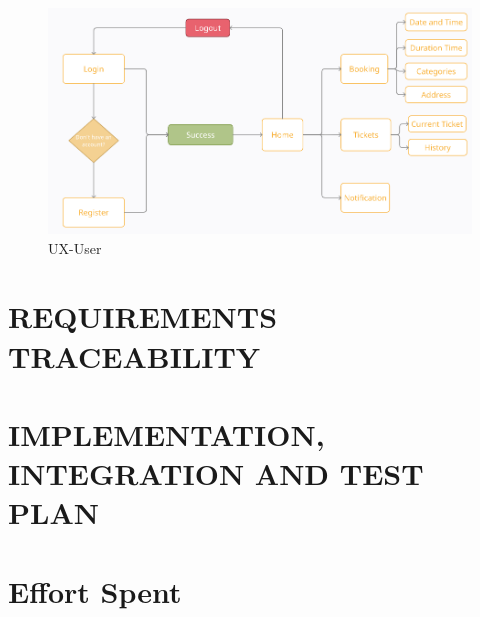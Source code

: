 \documentclass[a4paper,12pt]{report}
\begin{document}
\begin{figure}[H]
	\centering
	\includegraphics[scale=0.5]{UX-User.png}
	\caption{UX-User}
	\centering
	\label{UX-User}
\end{figure}



\chapter{REQUIREMENTS TRACEABILITY}\label{ch:requirements-traceability}


\chapter{IMPLEMENTATION, INTEGRATION AND TEST PLAN}\label{ch:implementation-integration-and-test-plan}


\chapter{Effort Spent}
\end{document}
